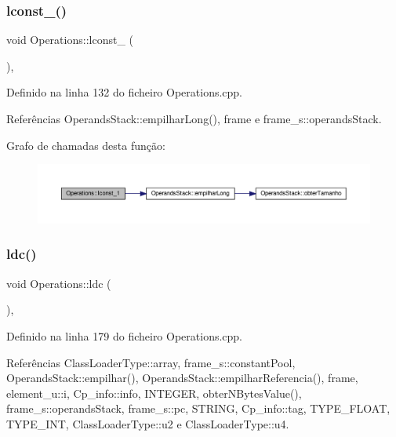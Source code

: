 \subsubsection{\texorpdfstring{lconst\+\_()}{lconst\_1()}}
{\footnotesize\ttfamily void Operations\+::lconst\+\_ (\begin{DoxyParamCaption}{ }\end{DoxyParamCaption})\hspace{0.3cm}{\ttfamily [static]}, {\ttfamily [private]}}



Definido na linha 132 do ficheiro Operations.\+cpp.



Referências Operands\+Stack\+::empilhar\+Long(), frame e frame\+\_\+s\+::operands\+Stack.

Grafo de chamadas desta função\+:
\nopagebreak
\begin{figure}[H]
\begin{center}
\leavevmode
\includegraphics[width=350pt]{classOperations_ae6c6a8e3d75dec712e534434f85909ce_cgraph}
\end{center}
\end{figure}
\mbox{\label{classOperations_aa9a87c1ef4605d0b7b7a99c8d9bc693c}} 
\subsubsection{\texorpdfstring{ldc()}{ldc()}}
{\footnotesize\ttfamily void Operations\+::ldc (\begin{DoxyParamCaption}{ }\end{DoxyParamCaption})\hspace{0.3cm}{\ttfamily [static]}, {\ttfamily [private]}}



Definido na linha 179 do ficheiro Operations.\+cpp.



Referências Class\+Loader\+Type\+::array, frame\+\_\+s\+::constant\+Pool, Operands\+Stack\+::empilhar(), Operands\+Stack\+::empilhar\+Referencia(), frame, element\+\_\+u\+::i, Cp\+\_\+info\+::info, I\+N\+T\+E\+G\+ER, obter\+N\+Bytes\+Value(), frame\+\_\+s\+::operands\+Stack, frame\+\_\+s\+::pc, S\+T\+R\+I\+NG, Cp\+\_\+info\+::tag, T\+Y\+P\+E\+\_\+\+F\+L\+O\+AT, T\+Y\+P\+E\+\_\+\+I\+NT, Class\+Loader\+Type\+::u2 e Class\+Loader\+Type\+::u4.

